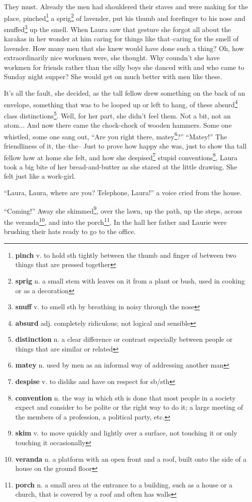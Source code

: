 They must. Already the men had shouldered their staves and were making for the place, pinched\footnote{\textbf{pinch} v. to hold sth tightly between the thumb and finger of between two things that are pressed together} a sprig\footnote{\textbf{sprig} n. a small stem with leaves on it from a plant or bush, used in cooking or as a decoration} of lavender, put his thumb and forefinger to his nose and snuffed\footnote{\textbf{snuff} v. to smell sth by breathing in noisy through the nose} up the smell. When Laura saw that gesture she forgot all about the karakas in her wonder at him caring for things like that--caring for the smell of lavender. How many men that she knew would have done such a thing? Oh, how extraordinarily nice workmen were, she thought. Why coundn't she have workmen for friends rather than the silly boys she danced with and who came to Sunday night supper? She would get on much better with men like these.

It's all the fault, she decided, as the tall fellow drew something on the back of an envelope, something that was to be looped up or left to hang, of these absurd\footnote{\textbf{absurd} adj. completely ridiculous; not logical and sensible} class distinctions\footnote{\textbf{distinction} n. a clear difference or contrast especially between people or things that are similar or related}. Well, for her part, she didn't feel them. Not a bit, not an atom... And now there came the chock-chock of wooden hammers. Some one whistled, some one sang out, ``Are you right there, matey\footnote{\textbf{matey} n. used by men as an informal way of addressing another man}?'' ``Matey!'' The friendliness of it, the--the-- Just to prove how happy she was, just to show tha tall fellow how at home she felt, and how she despised\footnote{\textbf{despise} v. to dislike and have on respect for sb/sth} stupid conventions\footnote{\textbf{convention} n. the way in which sth is done that most people in a society expect and consider to be polite or the right way to do it; a large meeting of the members of a profession, a political party, etc.}, Laura took a big bite of her bread-and-butter as she stared at the little drawing. She felt just like a work-girl.

``Laura, Laura, where are you? Telephone, Laura!'' a voice cried from the house.

``Coming!'' Away she skimmed\footnote{\textbf{skim} v. to move quickly and lightly over a surface, not touching it or only touching it occasionally}, over the lawn, up the path, up the steps, across the veranda\footnote{\textbf{veranda} n. a platform with an open front and a roof, built onto the side of a house on the ground floor}, and into the porch\footnote{\textbf{porch} n. a small area at the entrance to a building, such as a house or a church, that is covered by a roof and often has walls}. In the hall her father and Laurie were brushing their hats ready to go to the office.

